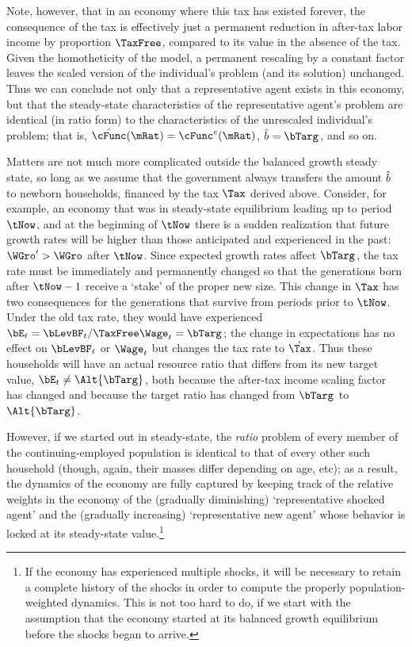 \documentclass{\handout}
\begin{document}
Note, however, that in an economy where this tax has existed forever, the consequence
of the tax is effectively just a permanent reduction in after-tax labor income by proportion $\TaxFree$, compared to its value in the absence of the tax.  
Given the homotheticity of the model, a permanent rescaling by a constant 
factor leaves the scaled version of the individual's problem (and its solution)
unchanged.  Thus we can conclude not only that a representative agent exists
in this economy, but that the steady-state characteristics of the 
representative agent's problem are identical (in ratio form) to the 
characteristics of the unrescaled individual's problem; that is, 
$\hat{\cFunc}(\mRat) = \cFunc^{e}(\mRat)$, $\hat{b}^{\null} = \bTarg^{\null}$, and so on.  

Matters are not much more complicated outside the balanced growth
steady state, so long as we assume that the government always
transfers the amount $\hat{b}^{\null}$ to newborn households, financed by
the tax $\Tax$ derived above.  Consider, for example, an economy that
was in steady-state equilibrium leading up to period $\tNow$, and at
the beginning of $\tNow$ there is a sudden realization that future
growth rates will be higher than those anticipated and experienced in
the past: $\WGro^{\prime} > \WGro$ after $\tNow$.  Since expected
growth rates affect $\bTarg^{\null}$, the tax rate must be immediately and
permanently changed so that the generations born after $\tNow-1$
receive a `stake' of the proper new size.  This change in $\Tax$ has
two consequences for the generations that survive from periods prior
to $\tNow$.  Under the old tax rate, they would have experienced
$\bE_{t} = \bLevBF_{t}/\TaxFree\Wage_{t} = \bTarg^{\null}$; the change in
expectations has no effect on $\bLevBF_{t}$ or $\Wage_{t}$ but changes
the tax rate to $\grave{\Tax}$.  Thus these households will have an
actual resource ratio that differs from its new target value, $\bE_{t}
\neq \Alt{\bTarg}^{\null}$, both because the after-tax income scaling factor
has changed and because the target ratio has changed from $\bTarg^{\null}$
to $\Alt{\bTarg}^{\null}$.

However, if we started out in steady-state, the {\it ratio} problem of every
member of the continuing-employed population is identical to that of every 
other such household (though, again, their masses differ depending on age, etc); as a result, the dynamics of the economy are fully captured
by keeping track of the relative weights in the economy of the (gradually diminishing) `representative shocked agent' and the (gradually increasing) `representative new agent' 
whose behavior is locked at its steady-state value.\footnote{
If the economy has experienced multiple shocks, it will be necessary to
retain a complete history of the shocks in order to compute the properly 
population-weighted dynamics.  This is not too hard to do, if we start with
the assumption that the economy started at its balanced growth equilibrium before the shocks began to arrive.}
\end{document}
